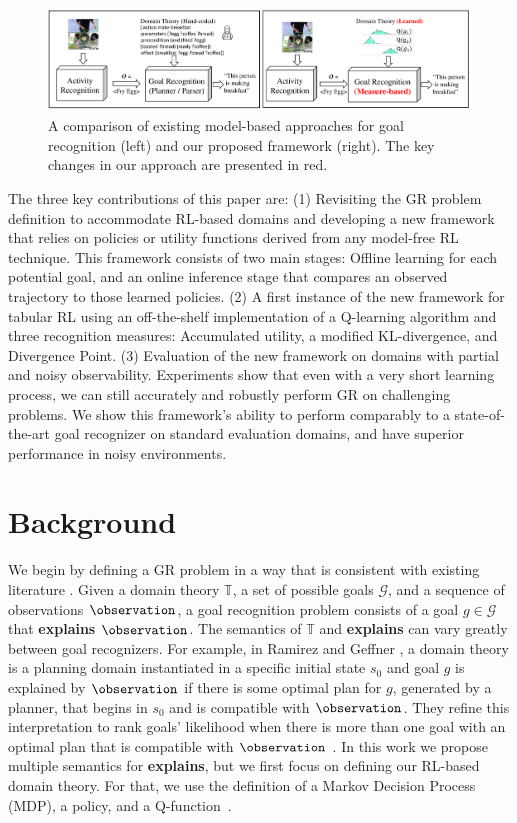\documentclass[letterpaper]{article} %
\providecommand\initialstate{\ensuremath{s_{0}}}
\providecommand\theory{\mathbb{T}}
\providecommand\goals{\mathcal{G}}
\providecommand\goal{g}
\begin{document}
\begin{figure}[t]
    \centering
    \includegraphics[width=\textwidth]{Figures/cooking-new.pdf}
    \caption{A comparison of existing model-based approaches for goal recognition (left) and our proposed framework (right). The key changes in our approach are presented in red.}
    \label{fig:cooking}
\end{figure}

The three key contributions of this paper are:
(1) Revisiting the GR problem definition to accommodate RL-based domains and developing a new framework that relies on policies or utility functions derived from any model-free RL technique. This framework consists of two main stages: Offline learning
for each potential goal, and an online inference stage that compares an observed trajectory to those learned policies.
(2) A first instance of the new framework for tabular RL
using an off-the-shelf implementation of a Q-learning algorithm and three recognition measures: Accumulated utility, a modified KL-divergence, and Divergence Point.
(3) Evaluation of the new framework
on domains with partial and noisy observability.
Experiments show that even with a very short learning process, we can still accurately and robustly perform GR on challenging problems.
We show this framework's ability to perform comparably to a state-of-the-art goal recognizer on standard evaluation domains, and have superior performance in noisy environments.

\section*{Background}
\label{sec:background}

We begin by defining a GR problem in a way that is consistent with existing literature \cite{Meneguzzi2021,mirsky2021introduction}. Given a domain theory $\theory$, a set of possible goals $\goals$, and a sequence of observations $\observation$, a goal recognition problem consists of a goal $\goal \in \goals$ that \textbf{explains} $\observation$. %
The semantics of $\theory$ and \textbf{explains} can vary greatly between goal recognizers.
For example, in Ramirez and Geffner , a domain theory is a planning domain instantiated in a specific initial state $\initialstate$ and goal $\goal$ is explained by $\observation$ if there is some optimal plan for $\goal$, generated by a planner, that begins in $\initialstate$ and is compatible with $\observation$.
They refine this interpretation to rank goals' likelihood when there is more than one goal with an optimal plan that is compatible with $\observation$ \cite{ramirez2010probabilistic}.
In this work we propose multiple semantics for \textbf{explains}, but we first focus on defining our RL-based domain theory.
For that, we use the definition of a Markov Decision Process (MDP), a policy, and a Q-function~\cite{sutton2018reinforcement}.
\end{document}
